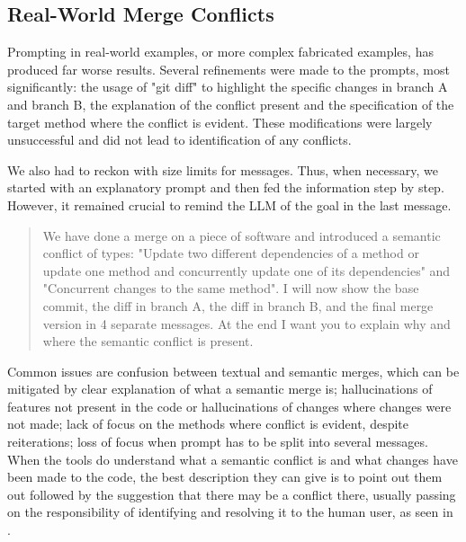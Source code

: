 \subsection{Real-World Merge Conflicts}

Prompting in real-world examples, or more complex fabricated examples, has produced far worse results. Several refinements were made to the prompts, most significantly: the usage of "git diff" to highlight the specific changes in branch A and branch B, the explanation of the conflict present and the specification of the target method where the conflict is evident. These modifications were largely unsuccessful and did not lead to identification of any conflicts.

We also had to reckon with size limits for messages. Thus, when necessary, we started with an explanatory prompt and then fed the information step by step. However, it remained crucial to remind the LLM of the goal in the last message.

\begin{quote}
We have done a merge on a piece of software and introduced a semantic conflict of types: "Update two different dependencies of a method or update one method and concurrently update one of its dependencies" and "Concurrent changes to the same method". I will now show the base commit, the diff in branch A, the diff in branch B, and the final merge version in 4 separate messages. At the end I want you to explain why and where the semantic conflict is present.
\end{quote}

Common issues are confusion between textual and semantic merges, which can be mitigated by clear explanation of what a semantic merge is; hallucinations of features not present in the code or hallucinations of changes where changes were not made; lack of focus on the methods where conflict is evident, despite reiterations; loss of focus when prompt has to be split into several messages. When the tools do understand what a semantic conflict is and what changes have been made to the code, the best description they can give is to point out them out followed by the suggestion that there may be a conflict there, usually passing on the responsibility of identifying and resolving it to the human user, as seen in .

